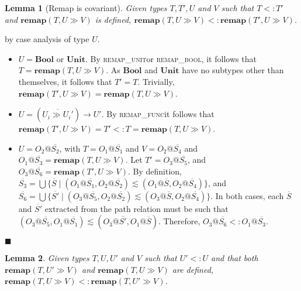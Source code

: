 \documentclass[preprint]{sigplanconf}
\makeatletter
\newtheorem{lem}{Lemma}
\newcommand{\remapunit}{\textsc{remap\_unit}}
\newcommand{\remapbool}{\textsc{remap\_bool}}
\newcommand{\remapfunc}{\textsc{remap\_func}}
\newcommand{\remapapp}[3]{\ensuremath{\mathbf{remap}(#1, #2 \gg #3)}}
\newcommand{\unitt}{\mathbf{Unit}}
\newcommand{\boolt}{\mathbf{Bool}}
\newcommand{\ot}[2]{#1@\overline{#2}}
\newcommand{\funt}[3]{(\overline{#1 \gg #2}) \rightarrow #3}
\newcommand{\qed}{$\blacksquare$}
\newenvironment{proof}{\vspace{1ex}\noindent{\bf Proof}\hspace{0.5em}}
  {\hfill\qed\vspace{1ex}}
\makeatother
\begin{document}

\begin{lem}[Remap is covariant]
\label{lem:remapcv}
Given types $T, T', U$ and $V$ such that $T <: T'$ and
$\remapapp{T}{U}{V}$ is defined,
$\remapapp{T}{U}{V} <: \remapapp{T'}{U}{V}$.
\end{lem}
\begin{proof}
by case analysis of type $U$.

\begin{itemize}
\item $U = \boolt$ or $\unitt$. By \remapunit or \remapbool, it follows
that $T = \remapapp{T}{U}{V}$. 
As $\boolt$ and $\unitt$ have no subtypes other than
themselves, it follows that $T' = T$. Trivially,
$\remapapp{T'}{U}{V} = \remapapp{T}{U}{V}$.

\item $U = \funt{U_i}{U_i'}{U'}$. By \remapfunc it follows that
$\remapapp{T'}{U}{V} = T' <: T = \remapapp{T}{U}{V}$.

\item $U = \ot{O_2}{S_2}$, with $T = \ot{O_1}{S_1}$ and $V = \ot{O_2}{S_4}$
and $\ot{O_1}{S_3} = \remapapp{T}{U}{V}$. Let $T' = \ot{O_3}{S_5}$,
and $\ot{O_3}{S_6} = \remapapp{T'}{U}{V}$. By definition,
$\overline{S_3} = \bigcup \{ \overline{S} \mid (\ot{O_1}{S_1}, \ot{O_2}{S_2}) \lesssim (\ot{O_1}{S}, \ot{O_2}{S_4}) \}$, and
$\overline{S_6} = \bigcup \{ \overline{S'} \mid (\ot{O_3}{S_5}, \ot{O_2}{S_2}) \lesssim (\ot{O_3}{S}, \ot{O_2}{S_4}) \}$.
In both cases, each $\overline{S}$ and $\overline{S'}$ extracted from
the path relation must be such that 
$(\ot{O_3}{S_5}, \ot{O_1}{S_1}) \lesssim (\ot{O_3}{S'}, \ot{O_1}{S})$.
Therefore, $\ot{O_3}{S_6} <: \ot{O_1}{S_3}$.

\end{itemize}
\end{proof}



\begin{lem}
\label{lem:remap_in_contra}
Given types $T, U, U'$ and $V$ such that $U' <: U$ and that
both $\remapapp{T}{U'}{V}$ and $\remapapp{T}{U}{V}$ are defined,
$\remapapp{T}{U}{V} <: \remapapp{T}{U'}{V}$.
\end{lem}
\end{document}
